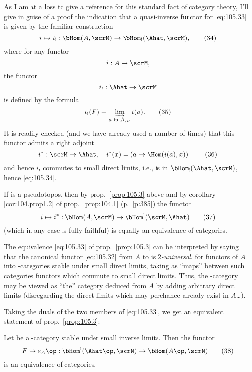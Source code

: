 As I am at a loss to give a reference for this standard fact of
category theory, I'll give in guise of a proof the indication that a
quasi-inverse functor for \eqref{eq:105.33} is given by the familiar
construction
\begin{equation}
  \label{eq:105.34}
  i\mapsto i_! : \bHom(A,\scrM)\to\bHom_!(\Ahat,\scrM),\tag{34}
\end{equation}
where for any functor
\[i:A\to\scrM,\]
the functor
\[i_!:\Ahat\to\scrM\]
is defined by the formula
\begin{equation}
  \label{eq:105.35}
  i_!(F) = \varinjlim_{\text{$a$ in $A_{/F}$}} i(a).\tag{35}
\end{equation}
It is readily checked (and we have already used a number of times)
that this functor admits a right adjoint
\begin{equation}
  \label{eq:105.36}
  i^*:\scrM\to\Ahat, \quad i^*(x)=(a \mapsto \Hom(i(a),x)),\tag{36}
\end{equation}
and hence $i_!$ commutes to small direct limits, i.e., is in
$\bHom_!(\Ahat,\scrM)$, hence \eqref{eq:105.34}.
\begin{remark}
  If \scrM{} is a pseudotopos, then by prop.\ \ref{prop:105.3} above
  and by corollary \ref{cor:104.prop1.2} of prop.\ \ref{prop:104.1}
  (p.\ \ref{p:385}) the functor
  \begin{equation}
    \label{eq:105.37}
    i\mapsto i^*: \bHom(A,\scrM) \to \bHom^!(\scrM,\Ahat)\tag{37}
  \end{equation}
  (which in any case is fully faithful) is equally an equivalence of
  categories. 
\end{remark}

The equivalence \eqref{eq:105.33} of prop.\
\ref{prop:105.3} can be interpreted by saying that the canonical
functor \eqref{eq:105.32} from $A$ to \Ahat{} is \emph{$2$-universal},
for functors of $A$ into \scrU-categories stable under small direct
limits, taking as ``maps'' between such categories functors which
commute to small direct limits. Thus, the \scrU-category \Ahat{} may
be viewed as ``the'' category deduced from $A$ by adding arbitrary
direct limits (disregarding the direct limits which may perchance
already exist in $A$\ldots).

Taking the duals of the two members of \eqref{eq:105.33}, we get an
equivalent statement of prop.\ \ref{prop:105.3}:
\setcounter{corollarynum}{0}
\begin{corollarynum}\label{cor:105.prop3.1}
  Let \scrN{} be a \scrU-category stable under small inverse
  limits. Then the functor
  \begin{equation}
    \label{eq:105.38}
    F\mapsto \varepsilon_A\op : \bHom^!(\Ahat\op,\scrN)\to \bHom(A\op,\scrN)\tag{38}
  \end{equation}
  is an equivalence of categories.
\end{corollarynum}

